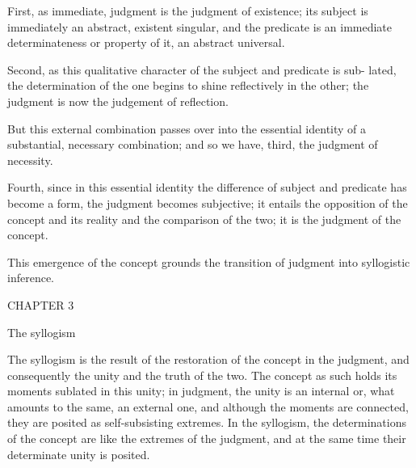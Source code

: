 First, as immediate, judgment is the judgment of existence; its subject is
immediately an abstract, existent singular, and the predicate is an immediate
determinateness or property of it, an abstract universal.

Second, as this qualitative character of the subject and predicate is sub-
lated, the determination of the one begins to shine reflectively in the other;
the judgment is now the judgement of reflection.

But this external combination passes over into the essential identity of a
substantial, necessary combination; and so we have, third, the judgment of
necessity.

Fourth, since in this essential identity the difference of subject and
predicate has become a form, the judgment becomes subjective; it entails
the opposition of the concept and its reality and the comparison of the two;
it is the judgment of the concept.

This emergence of the concept grounds the transition of judgment into
syllogistic inference.

CHAPTER 3

The syllogism

The syllogism is the result of the restoration of the concept in the judgment,
and consequently the unity and the truth of the two. The concept as such
holds its moments sublated in this unity; in judgment, the unity is an
internal or, what amounts to the same, an external one, and although the
moments are connected, they are posited as self-subsisting extremes. In the
syllogism, the determinations of the concept are like the extremes of
the judgment, and at the same time their determinate unity is posited.

